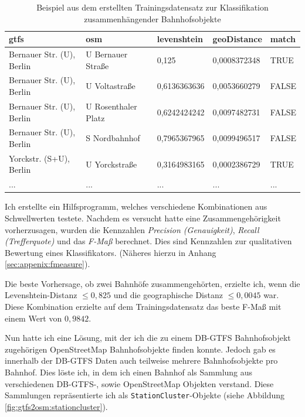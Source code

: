 \begin{table}[]
\small
\centering
\caption{Beispiel aus dem erstellten Trainingsdatensatz zur Klassifikation zusammenhängender Bahnhofsobjekte}
\label{tab:gtfs2osm:trainingset}
\begin{tabular}{|l|l|l|l|l|}
\hline
\textbf{gtfs}             & \textbf{osm}        & \textbf{levenshtein} & \textbf{geoDistance} & \textbf{match} \\ \hline
Bernauer Str. (U), Berlin & U Bernauer Straße   & 0,125                & 0,0008372348         & TRUE           \\ \hline
Bernauer Str. (U), Berlin & U Voltastraße       & 0,6136363636         & 0,0053660279         & FALSE          \\ \hline
Bernauer Str. (U), Berlin & U Rosenthaler Platz & 0,6242424242         & 0,0097482731         & FALSE          \\ \hline
Bernauer Str. (U), Berlin & S Nordbahnhof       & 0,7965367965         & 0,0099496517         & FALSE          \\ \hline
Yorckstr. (S+U), Berlin   & U Yorckstraße       & 0,3164983165         & 0,0002386729         & TRUE           \\ \hline
...                       & ...                 & ...                  & ...                  & ...            \\ \hline
\end{tabular}
\end{table}

Ich erstellte ein Hilfsprogramm, welches verschiedene Kombinationen aus Schwellwerten testete. Nachdem es versucht hatte eine Zusammengehörigkeit vorherzusagen, wurden die Kennzahlen \textit{Precision (Genauigkeit)}, \textit{Recall (Trefferquote)} und das \textit{F-Maß} berechnet. Dies sind Kennzahlen zur qualitativen Bewertung eines Klassifikators. (Näheres hierzu in Anhang \ref{sec:appenix:fmeasure}).

Die beste Vorhersage, ob zwei Bahnhöfe zusammengehörten, erzielte ich, wenn die Levenshtein-Distanz $\leq0,825$ und die geographische Distanz $\leq0,0045$ war. Diese Kombination erzielte auf dem Trainingsdatensatz das beste F-Maß mit einem Wert von $0,9842$.

Nun hatte ich eine Lösung, mit der ich die zu einem DB-GTFS Bahnhofsobjekt zugehörigen OpenStreetMap Bahnhofsobjekte finden konnte. Jedoch gab es innerhalb der DB-GTFS Daten auch teilweise mehrere Bahnhofsobjekte pro Bahnhof.
Dies löste ich, in dem ich einen Bahnhof als Sammlung aus verschiedenen DB-GTFS-, sowie OpenStreetMap Objekten verstand.
Diese Sammlungen repräsentierte ich als \texttt{StationCluster}-Objekte (siehe Abbildung \ref{fig:gtfs2osm:stationcluster}).

